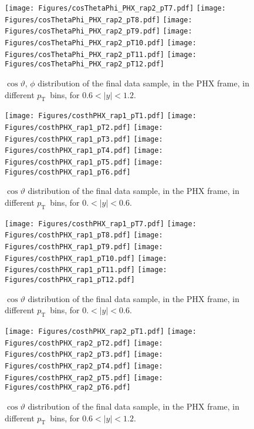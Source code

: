 \documentclass[12pt]{article}
\newcommand{\pt}{$p_{\mathrm{T}}$}
\begin{document}
\begin{figure}[htbp]
\centering
\texttt{[image: Figures/cosThetaPhi\_PHX\_rap2\_pT7.pdf]}
\texttt{[image: Figures/cosThetaPhi\_PHX\_rap2\_pT8.pdf]}
\texttt{[image: Figures/cosThetaPhi\_PHX\_rap2\_pT9.pdf]}
\texttt{[image: Figures/cosThetaPhi\_PHX\_rap2\_pT10.pdf]}
\texttt{[image: Figures/cosThetaPhi\_PHX\_rap2\_pT11.pdf]}
\texttt{[image: Figures/cosThetaPhi\_PHX\_rap2\_pT12.pdf]}
\caption{$\cos\vartheta,\,\phi$ distribution of the final data sample, 
	in the PHX frame, in different \pt\ bins, for $0.6 < |y| < 1.2$.}
\end{figure}
\clearpage

\begin{figure}[htbp]
\centering
\texttt{[image: Figures/costhPHX\_rap1\_pT1.pdf]}
\texttt{[image: Figures/costhPHX\_rap1\_pT2.pdf]}
\texttt{[image: Figures/costhPHX\_rap1\_pT3.pdf]}
\texttt{[image: Figures/costhPHX\_rap1\_pT4.pdf]}
\texttt{[image: Figures/costhPHX\_rap1\_pT5.pdf]}
\texttt{[image: Figures/costhPHX\_rap1\_pT6.pdf]}
\caption{$\cos\vartheta$ distribution of the final data sample, 
	in the PHX frame, in different \pt\ bins, for $0. < |y| < 0.6$.}
\end{figure}
\clearpage

\begin{figure}[htbp]
\centering
\texttt{[image: Figures/costhPHX\_rap1\_pT7.pdf]}
\texttt{[image: Figures/costhPHX\_rap1\_pT8.pdf]}
\texttt{[image: Figures/costhPHX\_rap1\_pT9.pdf]}
\texttt{[image: Figures/costhPHX\_rap1\_pT10.pdf]}
\texttt{[image: Figures/costhPHX\_rap1\_pT11.pdf]}
\texttt{[image: Figures/costhPHX\_rap1\_pT12.pdf]}
\caption{$\cos\vartheta$ distribution of the final data sample, 
	in the PHX frame, in different \pt\ bins, for $0. < |y| < 0.6$.}
\end{figure}
\clearpage

\begin{figure}[htbp]
\centering
\texttt{[image: Figures/costhPHX\_rap2\_pT1.pdf]}
\texttt{[image: Figures/costhPHX\_rap2\_pT2.pdf]}
\texttt{[image: Figures/costhPHX\_rap2\_pT3.pdf]}
\texttt{[image: Figures/costhPHX\_rap2\_pT4.pdf]}
\texttt{[image: Figures/costhPHX\_rap2\_pT5.pdf]}
\texttt{[image: Figures/costhPHX\_rap2\_pT6.pdf]}
\caption{$\cos\vartheta$ distribution of the final data sample, 
	in the PHX frame, in different \pt\ bins, for $0.6 < |y| < 1.2$.}
\end{figure}
\clearpage
\end{document}
